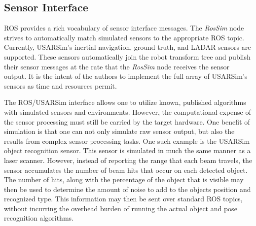 \subsection*{Sensor Interface} 
ROS provides a rich vocabulary of sensor interface messages. The {\it RosSim} node strives to automatically match simulated sensors to the appropriate ROS topic. Currently, USARSim's inertial navigation, ground truth, and LADAR sensors are supported. These sensors automatically join the robot transform tree and publish their sensor messages at the rate that the {\it RosSim} node receives the sensor output. It is the intent of the authors to implement the full array of USARSim's sensors as time and resources permit.

The ROS/USARSim interface allows one to utilize known, published algorithms with simulated sensors and environments. However, the computational expense of the sensor processing must still be carried by the target hardware. One benefit of simulation is that one can not only simulate raw sensor output, but also the results from complex sensor processing tasks. One such example is the USARSim object recognition sensor. This sensor  is simulated in much the same manner as a laser scanner. However, instead of reporting the range that each beam travels, the sensor accumulates the number of beam hits that occur on each detected object. The number of hits, along with the percentage of the object that is visible may then be used to determine the amount of noise to add to the objects position and recognized type. This information may then be sent over standard ROS topics, without incurring the overhead burden of running the actual object and pose recognition algorithms.
